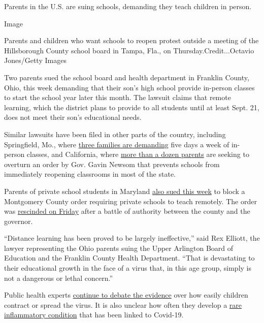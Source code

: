Parents in the U.S. are suing schools, demanding they teach children in
person.

Image

Parents and children who want schools to reopen protest outside a
meeting of the Hillsborough County school board in Tampa, Fla., on
Thursday.Credit...Octavio Jones/Getty Images

Two parents sued the school board and health department in Franklin
County, Ohio, this week demanding that their son's high school provide
in-person classes to start the school year later this month. The lawsuit
claims that remote learning, which the district plans to provide to all
students until at least Sept. 21, does not meet their son's educational
needs.

Similar lawsuits have been filed in other parts of the country,
including Springfield, Mo., where
\href{https://www.ky3.com/2020/07/31/springfield-attorney-files-lawsuit-against-springfield-public-schools-over-reopening-plan/}{three
families are demanding} five days a week of in-person classes, and
California, where
\href{https://www.ocregister.com/2020/08/07/parents-sue-gov-newsom-other-state-officials-demanding-in-person-instruction/}{more
than a dozen parents} are seeking to overturn an order by Gov. Gavin
Newsom that prevents schools from immediately reopening classrooms in
most of the state.

Parents of private school students in Maryland
\href{https://www.nytimes.com/2020/08/05/us/schools-reopening-private-public.html}{also
sued this week} to block a Montgomery County order requiring private
schools to teach remotely. The order was
\href{https://www.baltimoresun.com/coronavirus/bs-md-republicans-private-schools-20200807-3eiwqeyfgfh5nnppen3z4o7vba-story.html}{rescinded
on Friday} after a battle of authority between the county and the
governor.

``Distance learning has been proved to be largely ineffective,'' said
Rex Elliott, the lawyer representing the Ohio parents suing the Upper
Arlington Board of Education and the Franklin County Health Department.
``That is devastating to their educational growth in the face of a virus
that, in this age group, simply is not a dangerous or lethal concern.''

Public health experts
\href{https://www.nytimes.com/2020/07/30/health/coronavirus-children.html}{continue
to debate the evidence} over how easily children contract or spread the
virus. It is also unclear how often they develop a
\href{https://www.nytimes.com/2020/06/29/well/family/caring-for-children-with-multisystem-inflammatory-syndrome.html}{rare
inflammatory condition} that has been linked to Covid-19.

